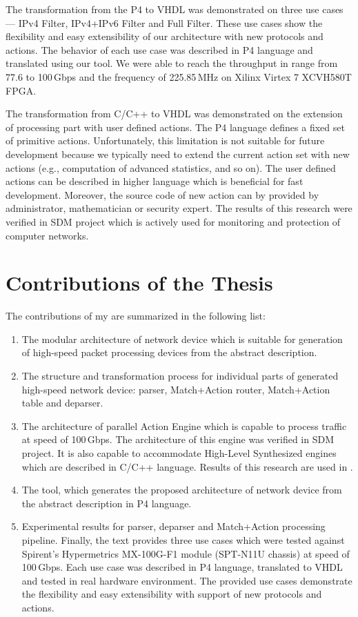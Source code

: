 The transformation from the P4 to VHDL was demonstrated on three use cases --- IPv4 Filter, IPv4+IPv6 Filter and Full Filter.
These use cases show the flexibility and easy extensibility of our architecture with new protocols and actions. The behavior of each use case
was described in P4 language and translated using our tool. We were able to reach the throughput in range from 77.6 to 100\,Gbps
and the frequency of 225.85\,MHz on Xilinx Virtex 7 XCVH580T FPGA. 

The transformation from C/C++ to VHDL was demonstrated on the extension of processing part with user defined actions.
The P4 language defines a fixed set of primitive actions. 
Unfortunately, this limitation is not suitable for future development because we typically need to extend the current action set with new actions 
(e.g., computation of advanced statistics, and so on). The user defined actions can be described in higher language which
is beneficial for fast development. Moreover, the source code of new action can by provided by administrator, mathematician or security expert.
The results of this research were verified in SDM \cite{KekelyPusKorenekSDM} project which is actively used for monitoring and protection 
of computer networks.

\section{Contributions of the Thesis}

The contributions of my \thesis{} are summarized in the following list:
\begin{enumerate}
    \item The modular architecture of network device which is suitable for generation of high-speed packet processing devices 
    from the abstract description.
    \item The structure and transformation process for individual parts of generated high-speed network device: 
    parser, Match+Action router, Match+Action table and deparser.
    \item The architecture of parallel Action Engine which is capable to process traffic at speed of 100\,Gbps. 
    The architecture of this engine was verified in SDM \cite{KekelyPusKorenekSDM} project.
    It is also capable to accommodate High-Level Synthesized engines which are described in C/C++ language.
    Results of this research are used in \cite{KekelyPusKorenekSdmIeeeTransactionComputerNetworks}.
    \item The tool, which generates the proposed architecture of network device from the abstract description in P4 language.
    \item Experimental results for parser, deparser and Match+Action processing pipeline. 
    Finally, the text provides three use cases which were tested 
    against Spirent's Hypermetrics MX-100G-F1 module (SPT-N11U chassis) at speed of 100\,Gbps. 
    Each use case was described in P4 language, translated to VHDL and tested in real hardware environment.
    The provided use cases demonstrate the flexibility and easy extensibility with support of new protocols and actions.
\end{enumerate}

